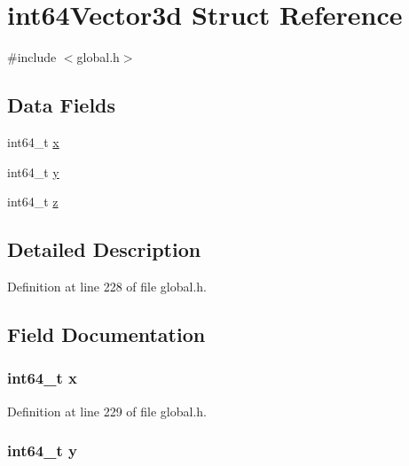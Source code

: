 \hypertarget{structint64Vector3d}{\section{int64\-Vector3d Struct Reference}
\label{structint64Vector3d}
}


{\ttfamily \#include $<$global.\-h$>$}

\subsection*{Data Fields}
\begin{DoxyCompactItemize}
\item 
int64\-\_\-t \hyperlink{structint64Vector3d_a040359f45343ce6667f5c66fda5f50e3}{x}
\item 
int64\-\_\-t \hyperlink{structint64Vector3d_a0cbcba26311a97b8e0763317e105a918}{y}
\item 
int64\-\_\-t \hyperlink{structint64Vector3d_a44624880ae3bb63041297b70cb33408b}{z}
\end{DoxyCompactItemize}


\subsection{Detailed Description}


Definition at line 228 of file global.\-h.



\subsection{Field Documentation}
\hypertarget{structint64Vector3d_a040359f45343ce6667f5c66fda5f50e3}{
\subsubsection[{x}]{\setlength{\rightskip}{0pt plus 5cm}int64\-\_\-t x}}\label{structint64Vector3d_a040359f45343ce6667f5c66fda5f50e3}


Definition at line 229 of file global.\-h.

\hypertarget{structint64Vector3d_a0cbcba26311a97b8e0763317e105a918}{
\subsubsection[{y}]{\setlength{\rightskip}{0pt plus 5cm}int64\-\_\-t y}}\label{structint64Vector3d_a0cbcba26311a97b8e0763317e105a918}


